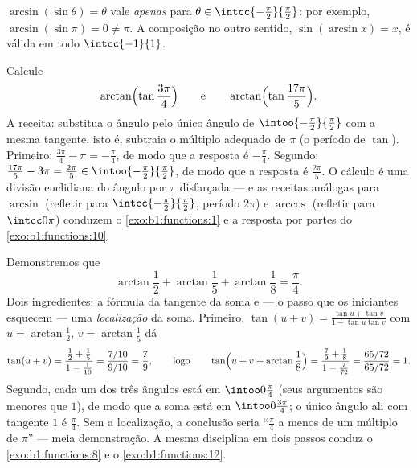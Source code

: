 \begin{remark}
$\arcsin(\sin\theta) = \theta$ vale \emph{apenas} para $\theta \in
\intcc{-\frac\pi2}{\frac\pi2}$: por exemplo,
$\arcsin(\sin\pi) = 0 \neq \pi$. A composição no outro
sentido, $\sin(\arcsin x) = x$, é válida em todo
$\intcc{-1}{1}$.
\end{remark}

\begin{example}
\label{ex:b1:functions:wrap}
Calcule
\[
\arctan\Bigl(\tan\frac{3\pi}4\Bigr)
\qquad\text{e}\qquad
\arctan\Bigl(\tan\frac{17\pi}5\Bigr).
\]
A receita: substitua o ângulo pelo único ângulo de
$\intoo{-\frac\pi2}{\frac\pi2}$ com a mesma tangente, isto é, subtraia o
múltiplo adequado de $\pi$ (o período de $\tan$). Primeiro: $\frac{3\pi}4 - \pi =
-\frac\pi4$, de modo que a resposta é $-\frac\pi4$. Segundo: $\frac{17\pi}
5 - 3\pi = \frac{2\pi}5 \in \intoo{-\frac\pi2}{\frac\pi2}$, de modo que
a resposta é $\frac{2\pi}5$. O cálculo é uma divisão euclidiana
do ângulo por $\pi$ disfarçada --- e as receitas análogas
para $\arcsin$ (refletir para
$\intcc{-\frac\pi2}{\frac\pi2}$, período $2\pi$) e $\arccos$
(refletir para $\intcc0\pi$) conduzem o \cref{exo:b1:functions:1} e
a resposta por partes do \cref{exo:b1:functions:10}.
\end{example}

\begin{example}\label{ex:b1:functions:arctansum}
Demonstremos que
\[
\arctan\frac12 + \arctan\frac15 + \arctan\frac18 = \frac\pi4 .
\]
Dois ingredientes: a fórmula da tangente da soma e --- o passo que os
iniciantes esquecem --- uma \emph{localização} da soma. Primeiro,
$\tan(u + v) = \frac{\tan u + \tan v}{1 - \tan u\tan v}$ com
$u = \arctan\frac12$, $v = \arctan\frac15$ dá
\[
\tan(u + v) = \frac{\frac12 + \frac15}{1 - \frac1{10}}
= \frac{7/10}{9/10} = \frac79,
\qquad\text{logo}\qquad
\tan\Bigl(u + v + \arctan\frac18\Bigr)
= \frac{\frac79 + \frac18}{1 - \frac7{72}}
= \frac{65/72}{65/72} = 1 .
\]
Segundo, cada um dos três ângulos está em $\intoo0{\frac\pi4}$
(seus argumentos são menores que $1$), de modo que a soma está em
$\intoo0{\frac{3\pi}4}$; o único ângulo ali com tangente $1$ é
$\frac\pi4$. Sem a localização, a conclusão seria
``$\frac\pi4$ a menos de um múltiplo de $\pi$'' --- meia demonstração. A
mesma disciplina em dois passos conduz o \cref{exo:b1:functions:8} e o
\cref{exo:b1:functions:12}.
\end{example}

